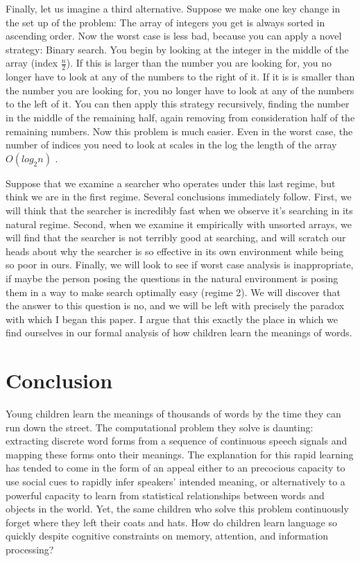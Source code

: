 \documentclass[review]{elsarticle}
\begin{document}
Finally, let us imagine a third alternative. Suppose we make one key change in the set up of the problem: The array of integers you get is always sorted in ascending order. Now the worst case is less bad, because you can apply a novel strategy: Binary search. You begin by looking at the integer in the middle of the array (index $\frac{n}{2}$). If this is larger than the number you are looking for, you no longer have to look at any of the numbers to the right of it. If it is is smaller than the number you are looking for, you no longer have to look at any of the numbers to the left of it. You can then apply this strategy recursively, finding the number in the middle of the remaining half, again removing from consideration half of the remaining numbers. Now this problem is much easier. Even in the worst case, the number of indices you need to look at scales in the log the length of the array $O\left(log_{2}n\right)$ \citep{knuth1998}.  

Suppose that we examine a searcher who operates under this last regime, but think we are in the first regime. Several conclusions immediately follow. First, we will think that the searcher is incredibly fast when we observe it's searching in its natural regime. Second, when we examine it empirically with unsorted arrays, we will find that the searcher is not terribly good at searching, and will scratch our heads about why the searcher is so effective in its own environment while being so poor in ours. Finally, we will look to see if worst case analysis is inappropriate, if maybe the person posing the questions in the natural environment is posing them in a way to make search optimally easy (regime 2). We will discover that the answer to this question is no, and we will be left with precisely the paradox with which I began this paper. I argue that this exactly the place in which we find ourselves in our formal analysis of how children learn the meanings of words.

\section{Conclusion}

Young children learn the meanings of thousands of words by the time they can run down the street\citep{mayor2011}. The computational problem they solve is daunting: extracting discrete word forms from a sequence of continuous speech signals and mapping these forms onto their meanings. The explanation for this rapid learning has tended to come in the form of an appeal either to an precocious capacity to use social cues to rapidly infer speakers' intended meaning, or alternatively to a powerful capacity to learn from statistical relationships between words and objects in the world. Yet, the same children who solve this problem continuously forget where they left their coats and hats. How do children learn language so quickly despite cognitive constraints on memory, attention, and information processing? 
 
\end{document}
